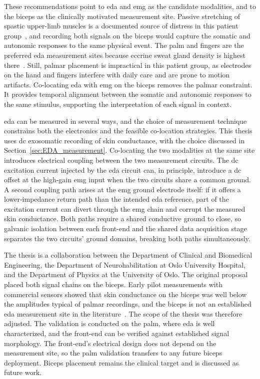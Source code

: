 These recommendations point to \gls{eda} and \gls{emg} as the candidate modalities, and to the biceps as the clinically motivated measurement site. Passive stretching of spastic upper-limb muscles is a documented source of distress in this patient group~\cite{kildal_increased_2021}, and recording both signals on the biceps would capture the somatic and autonomic responses to the same physical event. The palm and fingers are the preferred \gls{eda} measurement sites because eccrine sweat gland density is highest there~\cite{boucsein_electrodermal_2012}. Still, palmar placement is impractical in this patient group, as electrodes on the hand and fingers interfere with daily care and are prone to motion artifacts. Co-locating \gls{eda} with \gls{emg} on the biceps removes the palmar constraint. It provides temporal alignment between the somatic and autonomic responses to the same stimulus, supporting the interpretation of each signal in context.

\gls{eda} can be measured in several ways, and the choice of measurement technique constrains both the electronics and the feasible co-location strategies. This thesis uses \gls{dc} exosomatic recording of skin conductance, with the choice discussed in Section~\ref{sec:EDA_measurement}. Co-locating the two modalities at the same site introduces electrical coupling between the two measurement circuits. The \gls{dc} excitation current injected by the \gls{eda} circuit can, in principle, introduce a \gls{dc} offset at the high-gain \gls{emg} input when the two circuits share a common ground. A second coupling path arises at the \gls{emg} ground electrode itself: if it offers a lower-impedance return path than the intended \gls{eda} reference, part of the excitation current can divert through the \gls{emg} chain and corrupt the measured skin conductance. Both paths require a shared conductive ground to close, so galvanic isolation between each front-end and the shared data acquisition stage separates the two circuits' ground domains, breaking both paths simultaneously.

The thesis is a collaboration between the Department of Clinical and Biomedical Engineering, the Department of Neurohabilitation at Oslo University Hospital, and the Department of Physics at the University of Oslo. The original proposal placed both signal chains on the biceps. Early pilot measurements with commercial sensors showed that skin conductance on the biceps was well below the amplitudes typical of palmar recordings, and the biceps is not an established \gls{eda} measurement site in the literature~\cite{boucsein_electrodermal_2012, gersak_electrodermal_2020}. The scope of the thesis was therefore adjusted. The validation is conducted on the palm, where \gls{eda} is well characterized, and the front-end can be verified against established signal morphology. The front-end's electrical design does not depend on the measurement site, so the palm validation transfers to any future biceps deployment. Biceps placement remains the clinical target and is discussed as future work.

